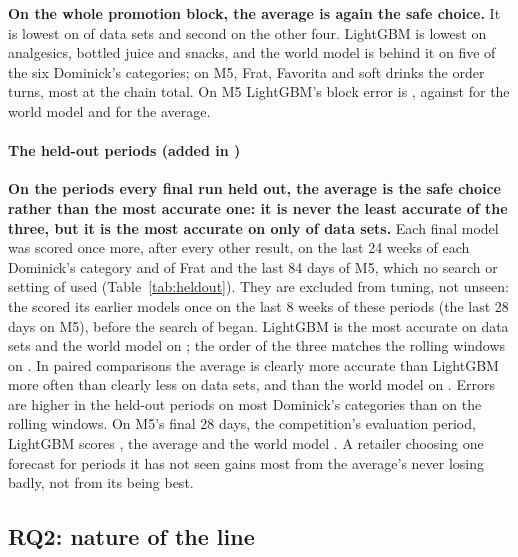\textbf{On the whole promotion block, the average is again the safe choice.} It
is lowest on \rqAvgBestBlockWord{} of \rqNineWord{} data sets and second on the other four. LightGBM is
lowest on analgesics, bottled juice and snacks, and the world model is behind it
on five of the six Dominick's categories; on M5, Frat, Favorita and soft drinks
the order turns, most at the chain total. On M5 LightGBM's block error is
\rqBlockMfiveLgb{}, against \rqBlockMfiveWm{} for the world model and \rqBlockMfiveAvg{}
for the average.



\paragraph{The held-out periods (added in \thisrev{})}
\textbf{On the periods every final run held out, the average is the safe choice
rather than the most accurate one: it is never the least accurate of the three,
but it is the most accurate on only \hoAvgBest{} of \hoSets{} data sets.} Each
final model was scored once more, after every other result, on the last 24 weeks
of each Dominick's category and of Frat and the last 84 days of M5, which no
search or setting of \thisrev{} used (Table~\ref{tab:heldout}). They are excluded from tuning, not unseen:
the \fvpaper{} scored its earlier models once on the last 8 weeks of these periods (the last 28 days
on M5), before the search of \thisrev{} began. LightGBM is the
most accurate on \hoLgbBest{} data sets and the world model on \hoWmBest{}; the
order of the three matches the rolling windows on \hoOrderSame{}. In paired
comparisons the average is clearly more accurate than LightGBM more often than
clearly less on \hoAvgBeatsLgb{} data sets, and than the world model on
\hoAvgBeatsWm. Errors are higher in the held-out periods on most Dominick's
categories than on the rolling windows. On M5's final 28 days, the competition's
evaluation period, LightGBM scores \hoMfiveFinalLGB{}, the average
\hoMfiveFinalAvg{} and the world model \hoMfiveFinalWM. A retailer choosing one
forecast for periods it has not seen gains most from the average's never losing
badly, not from its being best.



\subsection{RQ2: nature of the line}
\label{sec:rq-lines}

